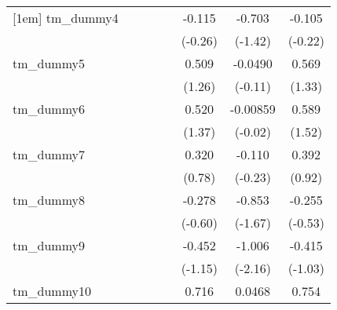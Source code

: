 {\begin{tabular}{l*{7}{c}}
[1em]
tm\_dummy4   &                     &                     &                     &                     &      -0.115         &      -0.703         &      -0.105         \\
            &                     &                     &                     &                     &     (-0.26)         &     (-1.42)         &     (-0.22)         \\
[1em]
tm\_dummy5   &                     &                     &                     &                     &       0.509         &     -0.0490         &       0.569         \\
            &                     &                     &                     &                     &      (1.26)         &     (-0.11)         &      (1.33)         \\
[1em]
tm\_dummy6   &                     &                     &                     &                     &       0.520         &    -0.00859         &       0.589         \\
            &                     &                     &                     &                     &      (1.37)         &     (-0.02)         &      (1.52)         \\
[1em]
tm\_dummy7   &                     &                     &                     &                     &       0.320         &      -0.110         &       0.392         \\
            &                     &                     &                     &                     &      (0.78)         &     (-0.23)         &      (0.92)         \\
[1em]
tm\_dummy8   &                     &                     &                     &                     &      -0.278         &      -0.853         &      -0.255         \\
            &                     &                     &                     &                     &     (-0.60)         &     (-1.67)         &     (-0.53)         \\
[1em]
tm\_dummy9   &                     &                     &                     &                     &      -0.452         &      -1.006\sym{*}  &      -0.415         \\
            &                     &                     &                     &                     &     (-1.15)         &     (-2.16)         &     (-1.03)         \\
[1em]
tm\_dummy10  &                     &                     &                     &                     &       0.716         &      0.0468         &       0.754         \\

\end{tabular}}
